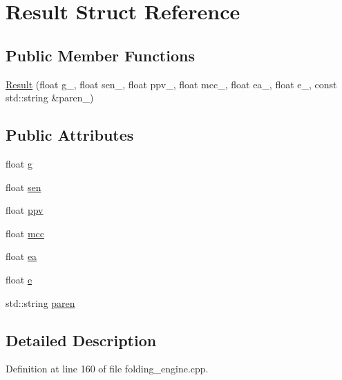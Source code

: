 \hypertarget{struct_result}{\section{Result Struct Reference}
\label{struct_result}
}
\subsection*{Public Member Functions}
\begin{DoxyCompactItemize}
\item 
\hyperlink{struct_result_aa445ec67b541cf68abebe5e2690cd4ce}{Result} (float g\+\_\+, float sen\+\_\+, float ppv\+\_\+, float mcc\+\_\+, float ea\+\_\+, float e\+\_\+, const std\+::string \&paren\+\_\+)
\end{DoxyCompactItemize}
\subsection*{Public Attributes}
\begin{DoxyCompactItemize}
\item 
float \hyperlink{struct_result_abc9ebc61c9bf5c894e28a41bbded49df}{g}
\item 
float \hyperlink{struct_result_a4e5d7f0713c789685bc004d2ba2ce13a}{sen}
\item 
float \hyperlink{struct_result_a7e3e0b23b5aa1d1238ecc84bb22c4730}{ppv}
\item 
float \hyperlink{struct_result_ab1732680ae2f2470872d1271303928a7}{mcc}
\item 
float \hyperlink{struct_result_a852fe7c67bf3479031184db1aa0d77e9}{ea}
\item 
float \hyperlink{struct_result_af5c4fcf9c970bc4fa6aa012983f4f7a8}{e}
\item 
std\+::string \hyperlink{struct_result_aac6267b349ffcbfc9407fb349f3e8ee2}{paren}
\end{DoxyCompactItemize}


\subsection{Detailed Description}


Definition at line 160 of file folding\+\_\+engine.\+cpp.



